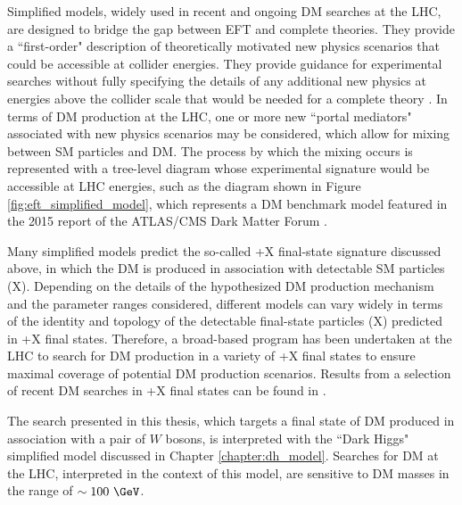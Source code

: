Simplified models, widely used in recent and ongoing DM searches at the LHC, are designed to bridge the gap between EFT and complete theories. They provide a ``first-order" description of theoretically motivated new physics scenarios that could be accessible at collider energies. They provide guidance for experimental searches without fully specifying the details of any additional new physics at energies above the collider scale that would be needed for a complete theory \cite{DM_colliders}. In terms of DM production at the LHC, one or more new ``portal mediators" associated with new physics scenarios may be considered, which allow for mixing between SM particles and DM. The process by which the mixing occurs is represented with a tree-level diagram whose experimental signature would be accessible at LHC energies, such as the diagram shown in Figure \ref{fig:eft_simplified_model}, which represents a DM benchmark model featured in the 2015 report of the ATLAS/CMS Dark Matter Forum \cite{dm_forum}. 

Many simplified models predict the so-called \met+X final-state signature discussed above, in which the DM is produced in association with detectable SM particles (X). Depending on the details of the hypothesized DM production mechanism and the parameter ranges considered, different models can vary widely in terms of the identity and topology of the detectable final-state particles (X) predicted in \met+X final states. Therefore, a broad-based program has been undertaken at the LHC to search for DM production in a variety of \met+X final states to ensure maximal coverage of potential DM production scenarios. Results from a selection of recent DM searches in \met+X final states can be found in \cite{monojet_cms_2021, monojet_atlas_2021, mono_hf_cms_2017, mono_hf_atlas_2018, mono_Z_atlas_2021, mono_Z_cms_2021, mono_h_cms_2020, mono_h_bb_atlas_2021, mono_h_gg_atlas_2021}.

The search presented in this thesis, which targets a final state of DM produced in association with a pair of \(W\) bosons, is interpreted with the ``Dark Higgs" simplified model \cite{Duerr2017} discussed in Chapter \ref{chapter:dh_model}. Searches for DM at the LHC, interpreted in the context of this model, are sensitive to DM masses in the range of \(\sim100~\GeV\).

